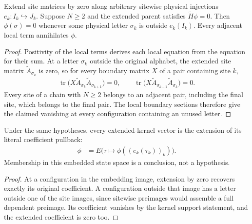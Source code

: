 \begin{lemma}
    \label{lem:varying_physical_kernel_forces_support}
    \leanok
    Extend site matrices by zero along arbitrary sitewise physical
    injections $e_k:I_k\hookrightarrow J_k$. Suppose $N\ge2$ and the extended
    parent satisfies $\widetilde H\phi=0$. Then $\phi(\sigma)=0$
    whenever some physical letter $\sigma_k$ is outside $e_k(I_k)$.
    Every adjacent local term annihilates $\phi$.
\end{lemma}
\begin{proof}\leanok
    Positivity of the local terms derives each local equation from
    the equation for their sum. At a letter $\sigma_k$ outside the original
    alphabet, the extended site matrix $\widetilde A_{\sigma_k}$ is zero, so
    for every boundary matrix $X$ of a pair containing site $k$,
    \begin{align}
        \operatorname{tr}\bigl(X\widetilde A_{\sigma_k}\widetilde A_{\sigma_{k+1}}\bigr)=0,
        \qquad
        \operatorname{tr}\bigl(X\widetilde A_{\sigma_{k-1}}\widetilde A_{\sigma_k}\bigr)=0.
        \label{eq:varying_physical_unused_letter_trace}
    \end{align} Every site of a chain with $N\ge2$ belongs to an
    adjacent pair, including the final site, which belongs to the final pair.
    The local boundary sections therefore give the claimed vanishing at
    every configuration containing an unused letter.
\end{proof}

\begin{lemma}
    \label{lem:varying_physical_kernel_actual_pullback}
    \leanok
    Under the same hypotheses, every extended-kernel vector is the
    extension of its literal coefficient pullback:
    \begin{align}
        \phi & =E\bigl(\tau\mapsto\phi((e_k(\tau_k))_k)\bigr).
    \end{align}
    Membership in this embedded state space is a conclusion, not a hypothesis.
\end{lemma}
\begin{proof}\leanok
    At a configuration in the embedding image, extension by zero recovers
    exactly its original coefficient. A configuration outside that image has
    a letter outside one of the site images, since sitewise preimages would
    assemble a full dependent preimage. Its coefficient vanishes by the
    kernel support statement, and the extended coefficient is zero too.
\end{proof}

